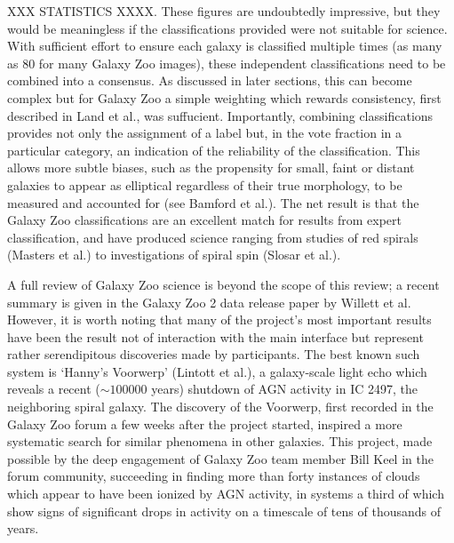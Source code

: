 \documentclass{ar2e}
\begin{document}
\begin{itemize}
XXX STATISTICS XXXX. These figures are undoubtedly impressive, but they would
be meaningless if the classifications provided were not suitable for science.
With sufficient effort to ensure each galaxy is classified multiple times (as
many as 80 for many Galaxy Zoo images), these independent classifications need
to be combined into a consensus. As discussed in later sections, this can
become complex but for Galaxy Zoo a simple weighting which rewards
consistency, first described in Land et al., was suffucient. Importantly,
combining classifications provides not only the assignment of a label but, in
the vote fraction in a particular category, an indication of the reliability
of the classification. This allows more subtle biases, such as the propensity
for small, faint or distant galaxies to appear as elliptical regardless of
their true morphology, to be measured and accounted for (see Bamford et al.).
The net result is that the Galaxy Zoo classifications are an excellent match
for results from expert classification, and have produced science ranging from
studies of red spirals (Masters et al.) to investigations of spiral spin
(Slosar et al.).

A full review of Galaxy Zoo science is beyond the scope of this review; a
recent summary is given in the Galaxy Zoo 2 data release paper by Willett et
al. However, it is worth noting that many of the project's most important
results have been the result not of interaction with the main interface but
represent rather serendipitous discoveries made by participants. The best
known such system is `Hanny's Voorwerp' (Lintott et al.), a galaxy-scale light
echo which reveals a recent ($\sim 100000$ years) shutdown of AGN activity in
IC 2497, the neighboring spiral galaxy. The discovery of the Voorwerp, first
recorded in the Galaxy Zoo forum a few weeks after the project started,
inspired a more systematic search for similar phenomena in other galaxies.
This project, made possible by the deep engagement of Galaxy Zoo team member
Bill Keel in the forum community, succeeding in finding more than forty
instances of clouds which appear to have been ionized by AGN activity, in
systems a third of which show signs of significant drops in activity on a
timescale of tens of thousands of years. 


\end{itemize}
\end{document}

